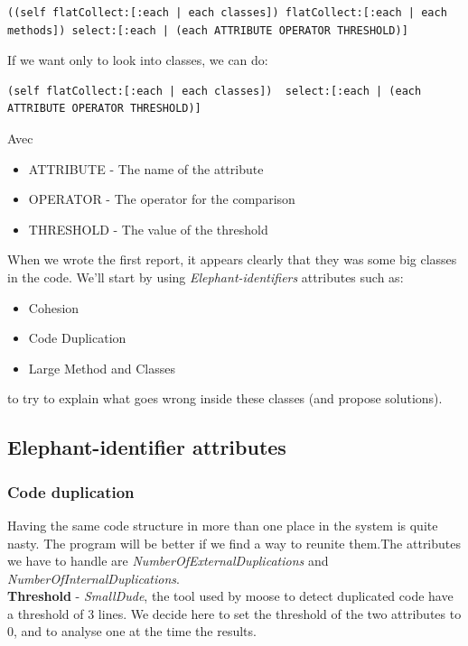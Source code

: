 \documentclass[11pt,a4paper]{article}
\begin{document}
\begin{lstlisting}
((self flatCollect:[:each | each classes]) flatCollect:[:each | each methods]) select:[:each | (each ATTRIBUTE OPERATOR THRESHOLD)] 
\end{lstlisting}

If we want only to look into classes, we can do:\\
\begin{lstlisting}
(self flatCollect:[:each | each classes])  select:[:each | (each ATTRIBUTE OPERATOR THRESHOLD)]
\end{lstlisting}
Avec
\begin{itemize}
\item ATTRIBUTE - The name of the attribute
\item OPERATOR - The operator for the comparison
\item THRESHOLD - The value of the threshold
 \end{itemize}

When we wrote the first report, it appears clearly that they was some big classes in the code. We'll start by using \textit{Elephant-identifiers} attributes such as:
\begin{itemize}
\item Cohesion
\item Code Duplication
\item Large Method and Classes
\end{itemize}

to try to explain what goes wrong inside these classes (and propose solutions).  
\subsection{Elephant-identifier attributes}
\subsubsection{Code duplication}
Having the same code structure in more than one place in the system is quite nasty. The program will be better if we find a way to reunite them.The attributes we have to handle are \textit{NumberOfExternalDuplications} and \textit{NumberOfInternalDuplications}.\\

\textbf{Threshold} - \textit{SmallDude}, the tool used by moose to detect duplicated code have a threshold of 3 lines. We decide here to set the threshold of the two attributes to 0, and to analyse one at the time the results.\\
\end{document}
